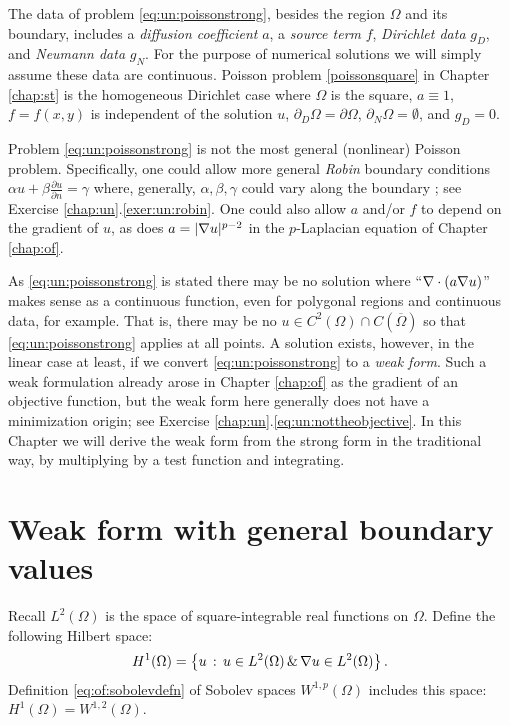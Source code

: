 The data of problem \eqref{eq:un:poissonstrong}, besides the region $\Omega$ and its boundary, includes a \emph{diffusion coefficient} $a$, a \emph{source term} $f$, \emph{Dirichlet data} $g_D$, and \emph{Neumann data} $g_N$.  For the purpose of numerical solutions we will simply assume these data are continuous.  Poisson problem \eqref{poissonsquare} in Chapter \ref{chap:st} is the homogeneous Dirichlet case where $\Omega$ is the square, $a\equiv 1$, $f=f(x,y)$ is independent of the solution $u$, $\partial_D \Omega = \partial \Omega$, $\partial_N \Omega = \emptyset$, and $g_D=0$.

Problem \eqref{eq:un:poissonstrong} is not the most general (nonlinear) Poisson problem.  Specifically, one could allow more general \emph{Robin} boundary conditions $\alpha u + \beta \frac{\partial u}{\partial n} = \gamma$ where, generally, $\alpha,\beta,\gamma$ could vary along the boundary \citep{Elmanetal2005}; see Exercise \ref{chap:un}.\ref{exer:un:robin}.  One could also allow $a$ and/or $f$ to depend on the gradient of $u$, as does $a=|\nabla u|^{p-2}$ in the $p$-Laplacian equation of Chapter \ref{chap:of}.

As \eqref{eq:un:poissonstrong} is stated there may be no solution where ``$\nabla\cdot(a\nabla u)$'' makes sense as a continuous function, even for polygonal regions and continuous data, for example.  That is, there may be no $u\in C^2(\Omega) \cap C(\overline \Omega)$ so that \eqref{eq:un:poissonstrong} applies at all points.  A solution exists, however, in the linear case at least, if we convert \eqref{eq:un:poissonstrong} to a \emph{weak form}.  Such a weak formulation already arose in Chapter \ref{chap:of} as the gradient of an objective function, but the weak form here generally does not have a minimization origin; see Exercise \ref{chap:un}.\ref{eq:un:nottheobjective}.  In this Chapter we will derive the weak form from the strong form in the traditional way, by multiplying by a test function and integrating.


\section{Weak form with general boundary values}

Recall $L^2(\Omega)$ is the space of square-integrable real functions on $\Omega$.  Define the following Hilbert space:
    $$H^1(\Omega) = \left\{u \,:\, u \in L^2(\Omega) \,\&\, \nabla u \in L^2(\Omega)\right\}.$$
Definition \eqref{eq:of:sobolevdefn} of Sobolev spaces $W^{1,p}(\Omega)$ includes this space: $H^1(\Omega) = W^{1,2}(\Omega)$.

